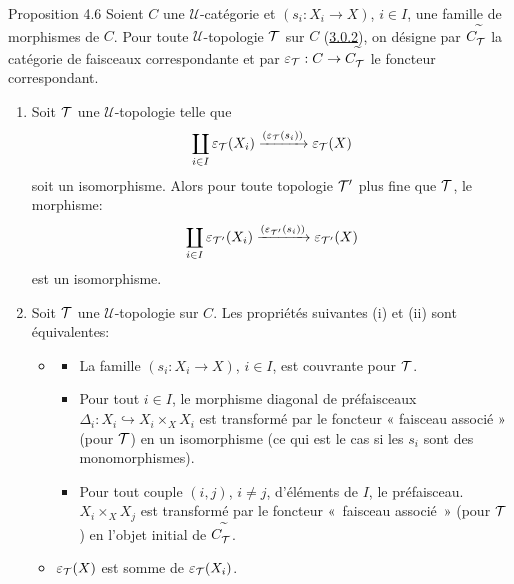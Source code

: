 \documentclass[10pt]{../fichiers-configuration-latex/smfart}
\begin{document}
\begin{enonce*}{Proposition 4.6}
Soient $C$ une $𝒰$-catégorie et $(s_i:X_i\rightarrow X)$,
$i\in I$, une famille de morphismes de $C$. Pour toute
$𝒰$-topologie ${\mathcal T}$ sur $C$ (\hyperref[II.def3.0.2]{3.0.2}), on désigne
par $C^{\widetilde{\phantom{,}}}_{{\mathcal T}}$ la catégorie de faisceaux
correspondante et par $\varepsilon_{{\mathcal T}}:C\rightarrow
C^{\widetilde{\phantom{,}}}_{{\mathcal T}}$ le foncteur correspondant.
\begin{enumerate}
\renewcommand{\labelenumi}{\theenumi)}
\item Soit ${\mathcal T}$ une $𝒰$-topologie telle que
$$
\coprod_{i\in I}
\varepsilon_{{\mathcal T}}(X_i)\xrightarrow{(\varepsilon_{{\mathcal T}}(s_i))}\varepsilon_{{\mathcal T}}(X)
$$
soit un isomorphisme. Alors pour toute topologie ${\mathcal T}'$ plus fine
que ${\mathcal T}$, le morphisme:
$$
\coprod_{i\in
  I}\varepsilon_{{\mathcal T}'}(X_i)\xrightarrow{(\varepsilon_{{\mathcal T}'}(s_i))}\varepsilon_{{\mathcal T}'}(X)
$$
est un isomorphisme.

\item Soit ${\mathcal T}$ une $𝒰$-topologie sur $C$. Les
  propriétés suivantes {\rm(i)} et {\rm(ii)} sont équivalentes:
\begin{itemize}
\item[i)]
\begin{itemize}
\item[a)] La famille $(s_i:X_i\rightarrow X)$, $i\in I$, est couvrante
  pour ${\mathcal T}$.

\item[b)] Pour tout $i\in I$, le morphisme diagonal de préfaisceaux
  $\Delta_i:X_i\hookrightarrow X_i\times_X X_i$\pageoriginale
  est transformé par
  le foncteur « faisceau associé » (pour ${\mathcal T}$) en un
  isomorphisme (ce qui est le cas si les $s_i$ sont des
  monomorphismes).

\item[c)] Pour tout couple $(i,j)$, $i\neq j$, d'éléments de $I$, le
  préfaisceau. $X_i\times_X X_j$ est transformé par le foncteur
  « faisceau associé » (pour ${\mathcal T}$) en l'objet initial
  de $C^{\widetilde{\phantom{,}}}_{{\mathcal T}}$.
\end{itemize}
\item[ii)] $\varepsilon_{{\mathcal T}}(X)$ est somme de $\varepsilon_{{\mathcal T}}(X_i)$.
\end{itemize}
\end{enumerate}
\end{enonce*}
\end{document}
